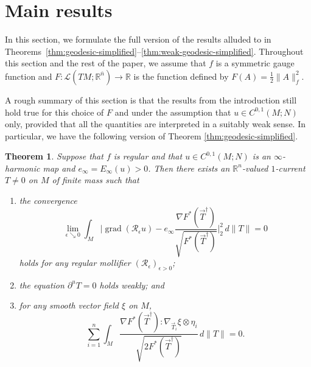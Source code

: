 \documentclass[10pt,a4paper]{amsart}
\newcommand{\R}{\mathbb{R}}
\newcommand{\ndim}{{\bar{n}}}
\newcommand{\Lin}{\mathcal{L}}
\DeclareMathOperator{\grad}{grad}
\newtheorem{theorem}{Theorem}
\begin{document}
\section{Main results} \label{sct:main-results}

In this section, we formulate the full version of the results alluded to in Theorems~\ref{thm:geodesic-simplified}--\ref{thm:weak-geodesic-simplified}. Throughout this section and the rest of the paper, we assume that
$f$ is a symmetric gauge function and $F \colon \Lin(TM; \R^\ndim) \to \R$ is the function defined by $F(A) = \frac{1}{2}\|A\|_f^2$.

A rough summary of this section is that the results from the introduction
still hold true for this choice of $F$ and under the assumption that
$u \in C^{0, 1}(M; N)$ only,
provided that all the quantities are interpreted in a suitably weak sense.
In particular, we have the following version of Theorem \ref{thm:geodesic-simplified}.

\begin{theorem} \label{thm:geodesic}
Suppose that $f$ is regular and that $u \in C^{0, 1}(M; N)$ is an $\infty$-harmonic map and $e_\infty = E_\infty(u) > 0$.
Then there exists an $\R^n$-valued $1$-current $T \neq 0$ on $M$ of finite mass such that
\begin{enumerate}
\item \label{itm:identity-for-du} the convergence
\begin{equation} \label{eq:represents-du}
\lim_{\epsilon \searrow 0} \int_M \biggl|\grad(\mathcal{R}_\epsilon u) - e_\infty \frac{\nabla F^*(\vec{T}^\dagger)}{\sqrt{F^*(\vec{T}^\dagger)}}\biggr|_2^2 \, d\|T\| = 0
\end{equation}
holds for any regular mollifier $(\mathcal{R}_\epsilon)_{\epsilon > 0}$;
\item \label{itm:boundary-vanishes} the equation $\partial^u T = 0$ holds weakly; and
\item for any smooth vector field $\xi$ on $M$,
\begin{equation} \label{eq:stationary}
\sum_{i = 1}^n \int_M \frac{\nabla F^*(\vec{T}^\dagger) : \nabla_{\vec{T}_i} \xi \otimes \eta_i}{\sqrt{2F^*(\vec{T}^\dagger)}} \, d\|T\| = 0.
\end{equation}
\end{enumerate}
\end{theorem}
\end{document}
